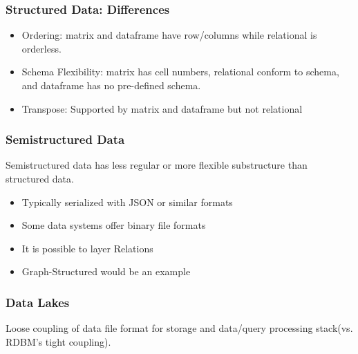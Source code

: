 \documentclass[12pt]{article}
\begin{document}
\subsubsection{Structured Data: Differences}
\begin{itemize}
    \item Ordering: matrix and dataframe have row/columns while relational is orderless.
    \item Schema Flexibility: matrix has cell numbers, relational conform to schema, and dataframe has no pre-defined schema.
    \item Transpose: Supported by matrix and dataframe but not relational
\end{itemize}

\subsubsection{Semistructured Data}
\begin{tcolorbox}[colback=green!5!white,colframe=green!75!black,title={Semistructured Data}]
    Semistructured data has less regular or more flexible substructure than structured data.
\end{tcolorbox}
\begin{itemize}
    \item Typically serialized with JSON or similar formats
    \item Some data systems offer binary file formats
    \item It is possible to layer Relations 
    \item Graph-Structured would be an example
\end{itemize}

\subsubsection{Data Lakes}
\begin{tcolorbox}[colback=green!5!white,colframe=green!75!black,title={Data Lakes}]
    Loose coupling of data file format for storage and data/query processing stack(vs. RDBM's tight coupling).
\end{tcolorbox}
\end{document}
